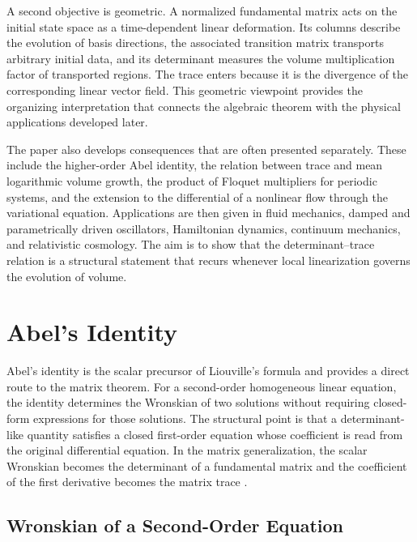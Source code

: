 \documentclass[11pt,a4paper]{article}
\theoremstyle{definition}
\numberwithin{equation}{section}
\begin{document}
A second objective is geometric. A normalized fundamental matrix acts on the initial state space as a time-dependent linear deformation. Its columns describe the evolution of basis directions, the associated transition matrix transports arbitrary initial data, and its determinant measures the volume multiplication factor of transported regions. The trace enters because it is the divergence of the corresponding linear vector field. This geometric viewpoint provides the organizing interpretation that connects the algebraic theorem with the physical applications developed later.

The paper also develops consequences that are often presented separately. These include the higher-order Abel identity, the relation between trace and mean logarithmic volume growth, the product of Floquet multipliers for periodic systems, and the extension to the differential of a nonlinear flow through the variational equation. Applications are then given in fluid mechanics, damped and parametrically driven oscillators, Hamiltonian dynamics, continuum mechanics, and relativistic cosmology. The aim is to show that the determinant--trace relation is a structural statement that recurs whenever local linearization governs the evolution of volume.

\section{Abel's Identity}

Abel's identity is the scalar precursor of Liouville's formula and provides a direct route to the matrix theorem. For a second-order homogeneous linear equation, the identity determines the Wronskian of two solutions without requiring closed-form expressions for those solutions. The structural point is that a determinant-like quantity satisfies a closed first-order equation whose coefficient is read from the original differential equation. In the matrix generalization, the scalar Wronskian becomes the determinant of a fundamental matrix and the coefficient of the first derivative becomes the matrix trace \cite{coddington1955,hartman2002,teschl2012}.

\subsection{Wronskian of a Second-Order Equation}
\end{document}
